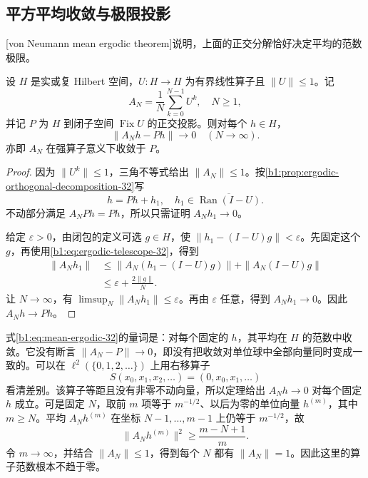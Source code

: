 \subsection{平方平均收敛与极限投影}
\label{b1:subsec:320204}

[von Neumann mean ergodic theorem]说明，上面的正交分解恰好决定平均的范数极限。

\begin{theorem}\label{b1:thm:mean-ergodic-32}
设 \(H\) 是实或复 Hilbert 空间，\(U\colon H\rightarrow H\) 为有界线性算子且 \(\|U\|\leq1\)。记
\[
 A_N=\frac1N\sum_{k=0}^{N-1}U^k,\quad N\geq1,
\]
并记 \(P\) 为 \(H\) 到闭子空间 \(\operatorname{Fix}U\) 的正交投影。则对每个 \(h\in H\)，
\begin{equation}\label{b1:eq:mean-ergodic-32}
 \|A_Nh-Ph\|\longrightarrow0\quad(N\to\infty).
\end{equation}
亦即 \(A_N\) 在强算子意义下收敛于 \(P\)。
\end{theorem}
\begin{proof}
因为 \(\|U^k\|\leq1\)，三角不等式给出 \(\|A_N\|\leq1\)。按\cref{b1:prop:ergodic-orthogonal-decomposition-32}写
\[
 h=Ph+h_1,\quad h_1\in\overline{\operatorname{Ran}(I-U)}.
\]
不动部分满足 \(A_NPh=Ph\)，所以只需证明 \(A_Nh_1\to0\)。

给定 \(\varepsilon>0\)，由闭包的定义可选 \(g\in H\)，使
\(\|h_1-(I-U)g\|<\varepsilon\)。先固定这个 \(g\)，再使用\eqref{b1:eq:ergodic-telescope-32}，得到
\[
 \begin{aligned}
 \|A_Nh_1\|
 &\leq\|A_N(h_1-(I-U)g)\|+\|A_N(I-U)g\|\\
 &\leq\varepsilon+\frac{2\|g\|}{N}.
 \end{aligned}
\]
让 \(N\to\infty\)，有 \(\limsup_N\|A_Nh_1\|\leq\varepsilon\)。再由 \(\varepsilon\) 任意，得到 \(A_Nh_1\to0\)。因此 \(A_Nh\to Ph\)。
\end{proof}

式\eqref{b1:eq:mean-ergodic-32}的量词是：对每个固定的 \(h\)，其平均在 \(H\) 的范数中收敛。它没有断言 \(\|A_N-P\|\to0\)，即没有把收敛对单位球中全部向量同时变成一致的。可以在 \(\ell^2(\{0,1,2,\ldots\})\) 上用右移算子
\[
 S(x_0,x_1,x_2,\ldots)=(0,x_0,x_1,\ldots)
\]
看清差别。该算子等距且没有非零不动向量，所以定理给出 \(A_Nh\to0\) 对每个固定 \(h\) 成立。可是固定 \(N\)，取前 \(m\) 项等于 \(m^{-1/2}\)、以后为零的单位向量 \(h^{(m)}\)，其中 \(m\geq N\)。平均 \(A_Nh^{(m)}\) 在坐标 \(N-1,\ldots,m-1\) 上仍等于 \(m^{-1/2}\)，故
\[
 \|A_Nh^{(m)}\|^2\geq\frac{m-N+1}{m}.
\]
令 \(m\to\infty\)，并结合 \(\|A_N\|\leq1\)，得到每个 \(N\) 都有 \(\|A_N\|=1\)。因此这里的算子范数根本不趋于零。

